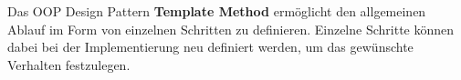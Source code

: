 Das OOP Design Pattern \textbf{Template Method} ermöglicht den allgemeinen Ablauf im Form von einzelnen Schritten zu definieren.
Einzelne Schritte können dabei bei der Implementierung neu definiert werden, um das gewünschte Verhalten festzulegen.
